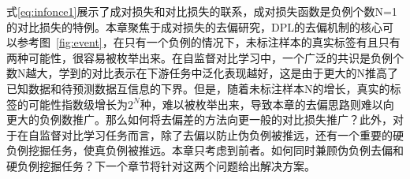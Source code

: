 式\eqref{eq:infonce1}展示了成对损失和对比损失的联系，成对损失函数是负例个数N=1的对比损失的特例。本章聚焦于成对损失的去偏研究，DPL的去偏机制的核心可以参考图~\ref{fig:event}，在只有一个负例的情况下，未标注样本的真实标签有且只有两种可能性，很容易被枚举出来。在自监督对比学习中，一个广泛的共识是负例个数N越大，学到的对比表示在下游任务中泛化表现越好\cite{Oord:2018:arxiv,Chuang:2020:NIPS,Robinson:2021:ICLR}，这是由于更大的N推高了已知数据和待预测数据互信息的下界。但是，随着未标注样本N的增长，真实的标签的可能性指数级增长为$2^N$种，难以被枚举出来，导致本章的去偏思路则难以向更大的负例数推广。那么如何将去偏差的方法向更一般的对比损失推广？此外，对于在自监督对比学习任务而言，除了去偏以防止伪负例被推远，还有一个重要的硬负例挖掘任务，使真负例被推远。本章只考虑到前者。如何同时兼顾伪负例去偏和硬负例挖掘任务？下一个章节将针对这两个问题给出解决方案。

